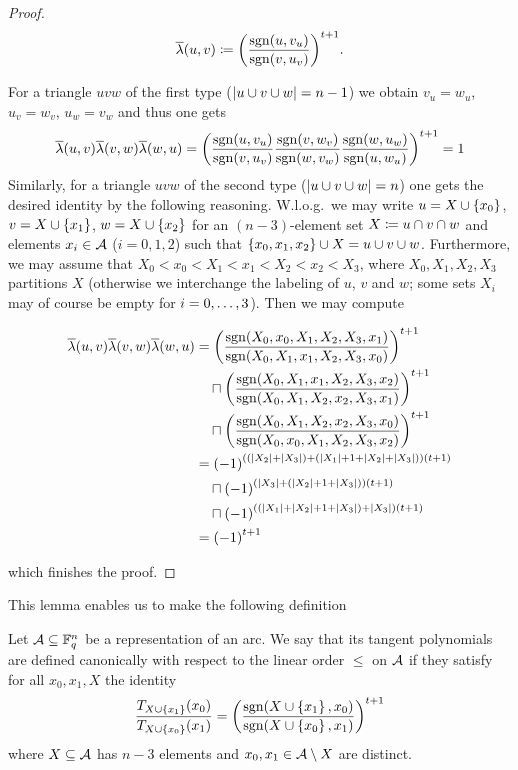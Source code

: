 \begin{proof}
    $$
    \overline{\lambda}(u,v)\mathrel{\mathrel{\mathop:}\mkern-1.2mu=} {\left(\frac{\mathop\mathrm{sgn}(u,v_u)}{\mathop\mathrm{sgn}(v,u_v)}\right)}^{t+1}\text{.}
    $$
    
    For a triangle $uvw$ of the first type ($\left\vert{u\cup v\cup w}\right\vert=n-1$) we obtain $v_u=w_u$, $u_v=w_v$, $u_w=v_w$ and thus one gets
    $$
    \overline{\lambda}(u,v)\overline{\lambda}(v,w)\overline{\lambda}(w,u) ={\left(\frac{\mathop\mathrm{sgn}(u,v_u)}{\mathop\mathrm{sgn}(v,u_v)}\frac{\mathop\mathrm{sgn}(v,w_v)}{\mathop\mathrm{sgn}(w,v_w)}\frac{\mathop\mathrm{sgn}(w,u_w)}{\mathop\mathrm{sgn}(u,w_u)}\right)}^{t+1}\\
    =1
    $$
    Similarly, for a triangle $uvw$ of the second type ($\left\vert{u\cup v\cup w}\right\vert=n$) one gets the desired identity by the following reasoning. W.l.o.g.\ we may write $u=X\setjoin\set{x_0}$, $v=X\setjoin\set{x_1}$, $w=X\setjoin\set{x_2}$ for an $(n-3)$-element set $X\mathrel{\mathrel{\mathop:}\mkern-1.2mu=} u\cap v\cap w$ and elements $x_i\in \mathcal{A}$ ($i=0,1,2$) such that $\set{x_0,x_1,x_2}\setjoin X=u\setjoin v\setjoin w$. Furthermore, we may assume that $X_0<x_0<X_1<x_1<X_2<x_2<X_3$, where $X_0,X_1,X_2,X_3$ partitions $X$ (otherwise we interchange the labeling of $u$, $v$ and $w$; some sets $X_i$ may of course be empty for $i=\range 0 3$). Then we may compute

    \begin{align*}
        \bar{\lambda}(u,v)\bar{\lambda}(v,w)\bar{\lambda}(w,u) 
 & = {\left(\frac{\sgn(X_0,x_0,X_1,X_2,X_3,x_1)}{\sgn(X_0,X_1,x_1,X_2,X_3,x_0)}\right)}^{t+1}              \\
 & \quad\setprod {\left(\frac{\sgn(X_0,X_1,x_1,X_2,X_3,x_2)}{\sgn(X_0,X_1,X_2,x_2,X_3,x_1)}\right)}^{t+1} \\
 & \quad\setprod {\left(\frac{\sgn(X_0,X_1,X_2,x_2,X_3,x_0)}{\sgn(X_0,x_0,X_1,X_2,X_3,x_2)}\right)}^{t+1} \\
 & = {(-1)}^{((|X_2|+|X_3|)+(|X_1|+1+|X_2|+|X_3|))(t+1)}                                                 \\
 & \quad\setprod {(-1)}^{(|X_3|+(|X_2|+1+|X_3|))(t+1)}                                                   \\
 & \quad\setprod {(-1)}^{((|X_1|+|X_2|+1+|X_3|)+|X_3|)(t+1)}                                            \\
 & = {(-1)}^{t+1}
\end{align*}

  which finishes the proof.
\end{proof}

This lemma enables us to make the following definition

\begin{definition}
    Let $\mathcal{A}\subseteq\mathbb{F}_{q}^n$ be a representation of an arc. We say that its tangent polynomials are defined canonically with respect to the linear order $\leq$ on $\mathcal{A}$ if they satisfy for all $x_0,x_1,X$ the identity
    $$
    \frac{T_{X\setjoin\set{x_1}}(x_0)}{T_{X\setjoin\set{x_0}}(x_1)} = {\left(\frac{\sgn(X\setjoin\set{x_1},x_0)}{\sgn(X\setjoin\set{x_0},x_1)}\right)}^{t+1}
    $$
    where $X\subseteq \mathcal{A}$ has $n-3$ elements and $x_0,x_1\in \mathcal{A}\setminus X$ are distinct.
\end{definition}

